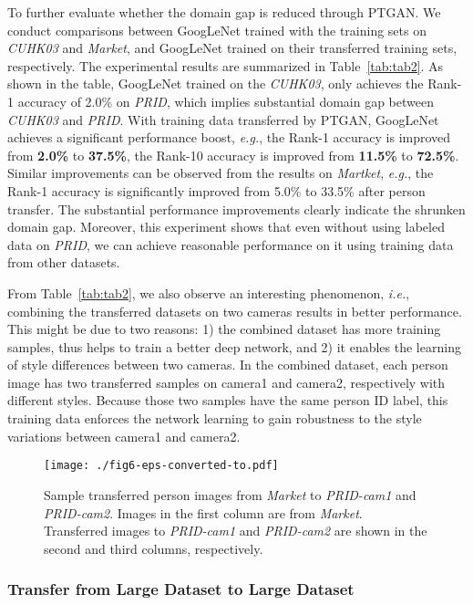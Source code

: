 \documentclass[10pt,twocolumn,letterpaper]{article}
\begin{document}
To further evaluate whether the domain gap is reduced through PTGAN. We conduct comparisons between GoogLeNet trained with the training sets on \emph{CUHK03} and \emph{Market}, and GoogLeNet trained on their transferred training sets, respectively. The experimental results are summarized in Table~\ref{tab:tab2}. As shown in the table, GoogLeNet trained on the \emph{CUHK03}, only achieves the Rank-1 accuracy of 2.0\% on \emph{PRID}, which implies substantial domain gap between \emph{CUHK03} and \emph{PRID}. With training data transferred by PTGAN, GoogLeNet achieves a significant performance boost, \emph{e.g.}, the Rank-1 accuracy is improved from \textbf{2.0\%} to \textbf{37.5\%}, the Rank-10 accuracy is improved from \textbf{11.5\%} to \textbf{72.5\%}. Similar improvements can be observed from the results on \emph{Martket}, \emph{e.g.}, the Rank-1 accuracy is significantly improved from 5.0\% to 33.5\% after person transfer. The substantial performance improvements clearly indicate the shrunken domain gap. Moreover, this experiment shows that even without using labeled data on \emph{PRID}, we can achieve reasonable performance on it using training data from other datasets.

From Table~\ref{tab:tab2}, we also observe an interesting phenomenon,\emph{ i.e.}, combining the transferred datasets on two cameras results in better performance. This might be due to two reasons: 1) the combined dataset has more training samples, thus helps to train a better deep network, and 2) it enables the learning of style differences between two cameras. In the combined dataset, each person image has two transferred samples on camera1 and camera2, respectively with different styles. Because those two samples have the same person ID label, this training data enforces the network learning to gain robustness to the style variations between camera1 and camera2.

\begin{figure}
\begin{center}
\texttt{[image: ./fig6-eps-converted-to.pdf]}
\end{center}
\caption{Sample transferred person images from \emph{Market} to \emph{PRID-cam1} and \emph{PRID-cam2}. Images in the first column are from \emph{Market}. Transferred images to \emph{PRID-cam1} and \emph{PRID-cam2} are shown in the second and third columns, respectively.}
\label{fig:fig6}
\end{figure}


\subsubsection{Transfer from Large Dataset to Large Dataset}
\label{sec:BigToBig}
\end{document}
